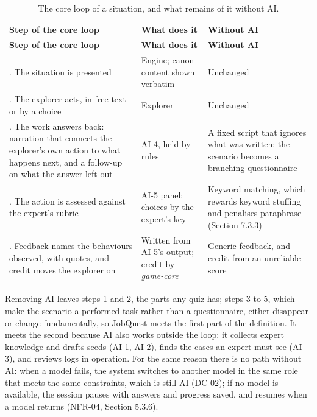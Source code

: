 {\small{}\renewcommand{\arraystretch}{1.1}
\begin{longtable}{|>{\raggedright\arraybackslash}p{}|>{\raggedright\arraybackslash}p{}|>{\raggedright\arraybackslash}p{}|}
\caption{The core loop of a situation, and what remains of it without AI.} \\
\hline
\textbf{Step of the core loop} & \textbf{What does it} & \textbf{Without AI} \\ \hline
\endfirsthead
\hline
\textbf{Step of the core loop} & \textbf{What does it} & \textbf{Without AI} \\ \hline
\endhead
1. The situation is presented & Engine; canon content shown verbatim & Unchanged \\ \hline
2. The explorer acts, in free text or by a choice & Explorer & Unchanged \\ \hline
3. The work answers back: narration that connects the explorer's own action to what happens next, and a follow-up on what the answer left out & AI-4, held by rules & A fixed script that ignores what was written; the scenario becomes a branching questionnaire \\ \hline
4. The action is assessed against the expert's rubric & AI-5 panel; choices by the expert's key & Keyword matching, which rewards keyword stuffing and penalises paraphrase (Section 7.3.3) \\ \hline
5. Feedback names the behaviours observed, with quotes, and credit moves the explorer on & Written from AI-5's output; credit by \textit{game-core} & Generic feedback, and credit from an unreliable score \\ \hline
\end{longtable}
}

Removing AI leaves steps 1 and 2, the parts any quiz has; steps 3 to 5, which make the scenario a performed task rather than a questionnaire, either disappear or change fundamentally, so JobQuest meets the first part of the definition. It meets the second because AI also works outside the loop: it collects expert knowledge and drafts seeds (AI-1, AI-2), finds the cases an expert must see (AI-3), and reviews logs in operation. For the same reason there is no path without AI: when a model fails, the system switches to another model in the same role that meets the same constraints, which is still AI (DC-02); if no model is available, the session pauses with answers and progress saved, and resumes when a model returns (NFR-04, Section 5.3.6).

